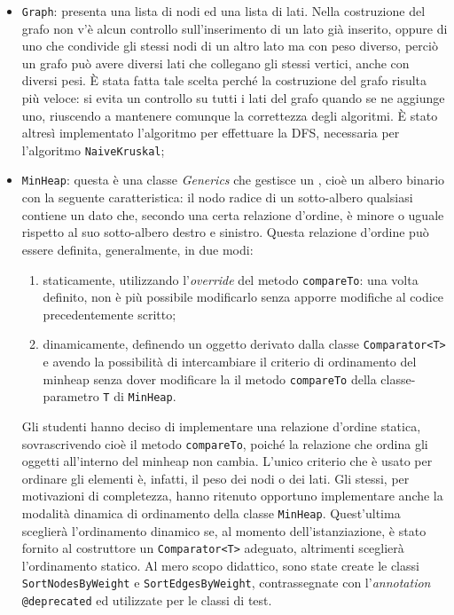 \begin{itemize}
\begin{itemize}
		\end{itemize}
	\item \texttt{Graph}: presenta una lista di nodi ed una lista di lati. Nella costruzione del grafo non v'è alcun controllo sull'inserimento di un lato già inserito, oppure di uno che condivide gli stessi nodi di un altro lato ma con peso diverso, perciò un grafo può avere diversi lati che collegano gli stessi vertici, anche con diversi pesi. È stata fatta tale scelta perché la costruzione del grafo risulta più veloce:  si evita un controllo su tutti i lati del grafo quando se ne aggiunge uno, riuscendo a mantenere comunque la correttezza degli algoritmi. È stato altresì implementato l'algoritmo per effettuare la DFS, necessaria per l'algoritmo \texttt{NaiveKruskal};	
	\item \texttt{MinHeap}: questa è una classe \emph{Generics} che gestisce un , cioè un albero binario con la seguente caratteristica: il nodo radice di un sotto-albero qualsiasi contiene un dato che, secondo una certa relazione d'ordine, è minore o uguale rispetto al suo sotto-albero destro e sinistro. Questa relazione d'ordine può essere definita, generalmente, in due modi:
	\begin{enumerate}
		\item staticamente, utilizzando l'\emph{override} del metodo \texttt{compareTo}: una volta definito, non è più possibile modificarlo senza apporre modifiche al codice precedentemente scritto;
		\item dinamicamente, definendo un oggetto derivato dalla classe \texttt{Comparator<T>} e avendo la possibilità di intercambiare il criterio di ordinamento del minheap senza dover modificare la il metodo \texttt{compareTo} della classe-parametro \texttt{T} di \texttt{MinHeap}.
	\end{enumerate}
	Gli studenti hanno deciso di implementare una relazione d'ordine statica, sovrascrivendo cioè il metodo \texttt{compareTo}, poiché la relazione che ordina gli oggetti all'interno del minheap non cambia. L'unico criterio che è usato per ordinare gli elementi è, infatti, il peso dei nodi o dei lati. Gli stessi, per motivazioni di completezza, hanno ritenuto opportuno implementare anche la modalità dinamica di ordinamento della classe \texttt{MinHeap}. Quest'ultima sceglierà l'ordinamento dinamico se, al momento dell'istanziazione, è stato fornito al costruttore un \texttt{Comparator<T>} adeguato, altrimenti sceglierà l'ordinamento statico. \eqcapo
	Al mero scopo didattico, sono state create le classi \texttt{SortNodesByWeight} e \texttt{SortEdgesByWeight}, contrassegnate con l'\emph{annotation} \texttt{@deprecated} ed utilizzate per le classi di test.\eqcapo

\end{itemize}
